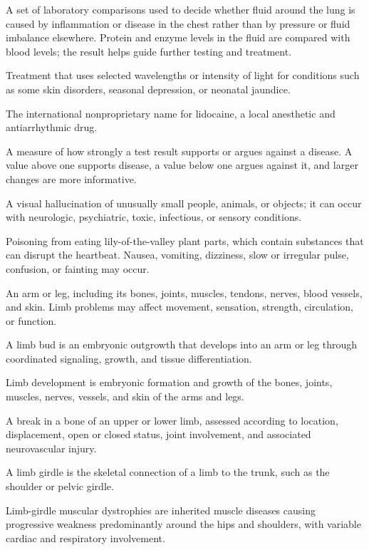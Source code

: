  A set of laboratory comparisons used to decide whether fluid around the lung is caused by inflammation or disease in the chest rather than by pressure or fluid imbalance elsewhere. Protein and enzyme levels in the fluid are compared with blood levels; the result helps guide further testing and treatment.

 Treatment that uses selected wavelengths or intensity of light for conditions such as some skin disorders, seasonal depression, or neonatal jaundice.

 The international nonproprietary name for lidocaine, a local anesthetic and antiarrhythmic drug.

 A measure of how strongly a test result supports or argues against a disease. A value above one supports disease, a value below one argues against it, and larger changes are more informative.

 A visual hallucination of unusually small people, animals, or objects; it can occur with neurologic, psychiatric, toxic, infectious, or sensory conditions.

 Poisoning from eating lily-of-the-valley plant parts, which contain substances that can disrupt the heartbeat. Nausea, vomiting, dizziness, slow or irregular pulse, confusion, or fainting may occur.

 An arm or leg, including its bones, joints, muscles, tendons, nerves, blood vessels, and skin. Limb problems may affect movement, sensation, strength, circulation, or function.

 A limb bud is an embryonic outgrowth that develops into an arm or leg through coordinated signaling, growth, and tissue differentiation.

 Limb development is embryonic formation and growth of the bones, joints, muscles, nerves, vessels, and skin of the arms and legs.

 A break in a bone of an upper or lower limb, assessed according to location, displacement, open or closed status, joint involvement, and associated neurovascular injury.

 A limb girdle is the skeletal connection of a limb to the trunk, such as the shoulder or pelvic girdle.

 Limb-girdle muscular dystrophies are inherited muscle diseases causing progressive weakness predominantly around the hips and shoulders, with variable cardiac and respiratory involvement.

